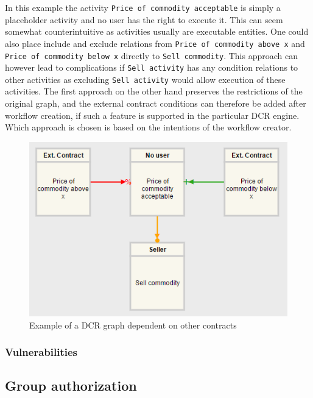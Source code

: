 \documentclass{article}
\begin{document}
		In this example the activity \texttt{Price of commodity acceptable} is simply a placeholder activity and no user has the right to execute it.
		This can seem somewhat counterintuitive as activities usually are executable entities. 
		One could also place include and exclude relations from \texttt{Price of commodity above x} and \texttt{Price of commodity below x} directly to \texttt{Sell commodity}.
		This approach can however lead to complications if \texttt{Sell activity} has any condition relations to other activities as excluding \texttt{Sell activity} would allow execution of these activities.
		The first approach on the other hand preserves the restrictions of the original graph, and the external contract conditions can therefore be added after workflow creation, if such a feature is supported in the particular DCR engine.
		Which approach is chosen is based on the intentions of the workflow creator.

		\begin{figure}[!ht]
		\centering
		\includegraphics{figures/external-contract-relations.png}
	 	\caption[External contract relations]
	 	{Example of a DCR graph dependent on other contracts}
	 	\label{fig:external-contract-relations}
		\end{figure}

		\subsubsection{Vulnerabilities}

		\subsection{Group authorization}
\end{document}

